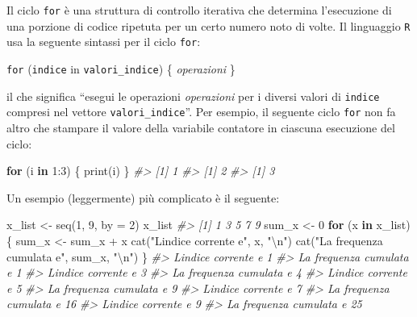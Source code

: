 \documentclass[
]{memoir}
\newenvironment{Shaded}{\begin{snugshade}}{\end{snugshade}}
\newcommand{\AttributeTok}[1]{\textcolor[rgb]{0.77,0.63,0.00}{#1}}
\newcommand{\CommentTok}[1]{\textcolor[rgb]{0.56,0.35,0.01}{\textit{#1}}}
\newcommand{\ControlFlowTok}[1]{\textcolor[rgb]{0.13,0.29,0.53}{\textbf{#1}}}
\newcommand{\DecValTok}[1]{\textcolor[rgb]{0.00,0.00,0.81}{#1}}
\newcommand{\FunctionTok}[1]{\textcolor[rgb]{0.00,0.00,0.00}{#1}}
\newcommand{\NormalTok}[1]{#1}
\newcommand{\OtherTok}[1]{\textcolor[rgb]{0.56,0.35,0.01}{#1}}
\newcommand{\SpecialCharTok}[1]{\textcolor[rgb]{0.00,0.00,0.00}{#1}}
\newcommand{\StringTok}[1]{\textcolor[rgb]{0.31,0.60,0.02}{#1}}
\theoremstyle{definition}
\theoremstyle{definition}
\theoremstyle{definition}
\theoremstyle{definition}
\theoremstyle{remark}
\begin{document}
Il ciclo \texttt{for} è una struttura di controllo iterativa che determina l'esecuzione di una porzione di codice ripetuta per un certo numero noto di volte. Il linguaggio \texttt{R} usa la seguente sintassi per il ciclo \texttt{for}:

\texttt{for} (\texttt{indice} in \texttt{valori\_indice}) \{
\emph{operazioni}
\}

il che significa ``esegui le operazioni \emph{operazioni} per i diversi valori di \texttt{indice} compresi nel vettore \texttt{valori\_indice}''. Per esempio, il seguente ciclo \texttt{for} non fa altro che stampare il valore della variabile contatore in ciascuna esecuzione del ciclo:

\begin{Shaded}
\begin{Highlighting}[]
\ControlFlowTok{for}\NormalTok{ (i }\ControlFlowTok{in} \DecValTok{1}\SpecialCharTok{:}\DecValTok{3}\NormalTok{) \{}
  \FunctionTok{print}\NormalTok{(i)}
\NormalTok{\}}
\CommentTok{\#\textgreater{} [1] 1}
\CommentTok{\#\textgreater{} [1] 2}
\CommentTok{\#\textgreater{} [1] 3}
\end{Highlighting}
\end{Shaded}

Un esempio (leggermente) più complicato è il seguente:

\begin{Shaded}
\begin{Highlighting}[]
\NormalTok{x\_list }\OtherTok{\textless{}{-}} \FunctionTok{seq}\NormalTok{(}\DecValTok{1}\NormalTok{, }\DecValTok{9}\NormalTok{, }\AttributeTok{by =} \DecValTok{2}\NormalTok{)}
\NormalTok{x\_list}
\CommentTok{\#\textgreater{} [1] 1 3 5 7 9}
\NormalTok{sum\_x }\OtherTok{\textless{}{-}} \DecValTok{0}
\ControlFlowTok{for}\NormalTok{ (x }\ControlFlowTok{in}\NormalTok{ x\_list) \{}
\NormalTok{  sum\_x }\OtherTok{\textless{}{-}}\NormalTok{ sum\_x }\SpecialCharTok{+}\NormalTok{ x}
  \FunctionTok{cat}\NormalTok{(}\StringTok{"L\textquotesingle{}indice corrente e\textquotesingle{}"}\NormalTok{, x, }\StringTok{"}\SpecialCharTok{\textbackslash{}n}\StringTok{"}\NormalTok{)}
  \FunctionTok{cat}\NormalTok{(}\StringTok{"La frequenza cumulata e\textquotesingle{}"}\NormalTok{, sum\_x, }\StringTok{"}\SpecialCharTok{\textbackslash{}n}\StringTok{"}\NormalTok{)}
\NormalTok{\}}
\CommentTok{\#\textgreater{} L\textquotesingle{}indice corrente e\textquotesingle{} 1 }
\CommentTok{\#\textgreater{} La frequenza cumulata e\textquotesingle{} 1 }
\CommentTok{\#\textgreater{} L\textquotesingle{}indice corrente e\textquotesingle{} 3 }
\CommentTok{\#\textgreater{} La frequenza cumulata e\textquotesingle{} 4 }
\CommentTok{\#\textgreater{} L\textquotesingle{}indice corrente e\textquotesingle{} 5 }
\CommentTok{\#\textgreater{} La frequenza cumulata e\textquotesingle{} 9 }
\CommentTok{\#\textgreater{} L\textquotesingle{}indice corrente e\textquotesingle{} 7 }
\CommentTok{\#\textgreater{} La frequenza cumulata e\textquotesingle{} 16 }
\CommentTok{\#\textgreater{} L\textquotesingle{}indice corrente e\textquotesingle{} 9 }
\CommentTok{\#\textgreater{} La frequenza cumulata e\textquotesingle{} 25}
\end{Highlighting}
\end{Shaded}
\end{document}
